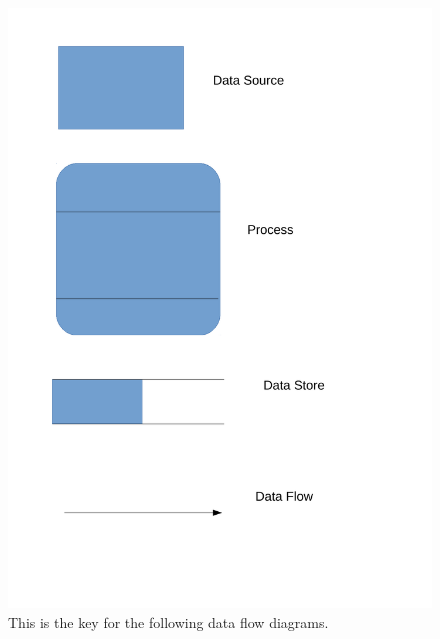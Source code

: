 \begin{algorithm}[H]
\begin{figure}[H]
    \includegraphics[width=\textwidth]{./Analysis/images/key.pdf}
    \caption{This is the key for the following data flow diagrams.} \label{fig:data_flow_diagram_key}
\end{figure}


\end{algorithm}
